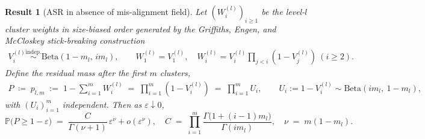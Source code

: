 \documentclass{article}
\newtheorem{theorem}{Result}
\theoremstyle{remark} %
\begin{document}
\begin{theorem}[ASR in absence of mis-alignment field]\label{thm:edge_PD}
 Let $(W_i^{(l)})_{i\ge1}$ be the level-$l$ cluster weights in
size-biased order generated by the Griffiths, Engen, and McCloskey stick-breaking construction
\begin{align}
V_i^{(l)} \stackrel{\text{indep.}}{\sim} \mathrm{Beta}(1-m_l,\, i m_l),
\qquad
W^{(l)}_1=V^{(l)}_1,\quad
W^{(l)}_i=V^{(l)}_i\prod_{j<i}(1-V^{(l)}_j)\ (i\ge2).
\end{align}
Define the residual mass after the first $m$ clusters,
\begin{align}
P \;\coloneqq\; p_{l,m} \;:=\; 1-\sum_{i=1}^m W_i^{(l)}
\;=\;\prod_{i=1}^m (1-V_i^{(l)}) \;=\;\prod_{i=1}^m U_i,
\qquad
U_i:=1-V_i^{(l)}\sim \mathrm{Beta}(i m_l,\ 1-m_l),
\end{align}
with $(U_i)_{i=1}^m$ independent. Then as $\varepsilon\downarrow 0$,
\begin{equation}
\mathbb P \big(P\ge 1-\varepsilon\big)
\;=\;
\frac{C}{\Gamma(\nu+1)}\,\varepsilon^{\nu} + o(\varepsilon^{\nu}),
 \quad C\;=\;\prod_{i=1}^{m}\frac{\Gamma \big(1+(i-1)m_l\big)}{\Gamma(im_l)}, \quad
\nu \;=\; m(1-m_l).
\label{eq:edge_law_PD}
\end{equation}
\end{theorem}
\end{document}
